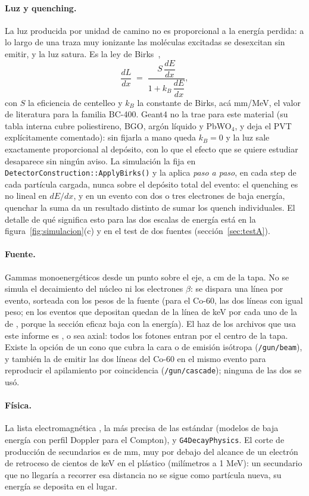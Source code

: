 \documentclass[11pt,a4paper]{article}
\begin{document}
\paragraph{Luz y quenching.} La luz producida por unidad de camino no es
proporcional a la energía perdida: a lo largo de una traza muy ionizante las
moléculas excitadas se desexcitan sin emitir, y la luz satura. Es la ley de
Birks~\cite{birks1951},
\[
   \frac{dL}{dx} \;=\; \frac{S\,\dfrac{dE}{dx}}{1 + k_B\,\dfrac{dE}{dx}},
\]
con $S$ la eficiencia de centelleo y $k_B$ la constante de Birks, acá
\SimBirks{} mm/MeV, el valor de literatura para la familia BC-400. Geant4 no
la trae para este material (su tabla interna cubre poliestireno, BGO, argón
líquido y PbWO$_4$, y deja el PVT explícitamente comentado): sin fijarla a
mano queda $k_B = 0$ y la luz sale exactamente proporcional al depósito, con
lo que el efecto que se quiere estudiar desaparece sin ningún aviso. La
simulación la fija en \texttt{DetectorConstruction::ApplyBirks()} y la
aplica \emph{paso a paso}, en cada step de cada partícula cargada, nunca
sobre el depósito total del evento: el quenching es no lineal en $dE/dx$, y
en un evento con dos o tres electrones de baja energía, quenchar la suma da
un resultado distinto de sumar los quench individuales. El detalle de qué
significa esto para las dos escalas de energía está en la
figura~\ref{fig:simulacion}(c) y en el test de dos fuentes
(sección~\ref{sec:testA}).

\paragraph{Fuente.} Gammas monoenergéticos desde un punto sobre el eje, a
\SimDistancia{} cm de la tapa. No se simula el decaimiento del núcleo ni los
electrones $\beta$: se dispara una línea por evento, sorteada con los pesos de
la fuente (para el Co-60, las dos líneas con igual peso; en los eventos que
depositan quedan \SimRazonLineasCo{} de la línea de \EgammaCoA{} keV por cada
uno de la de \EgammaCoB, porque la sección eficaz baja con la energía). El
haz de los archivos que usa este informe es \SimHaz, o sea axial: todos los
fotones entran por el centro de la tapa. Existe la opción de un cono que
cubra la cara o de emisión isótropa (\texttt{/gun/beam}), y también la de
emitir las dos líneas del Co-60 en el mismo evento para reproducir el
apilamiento por coincidencia (\texttt{/gun/cascade}); ninguna de las dos se
usó.

\paragraph{Física.} La lista electromagnética \SimFisica, la más precisa de
las estándar (modelos de baja energía con perfil Doppler para el Compton), y
\texttt{G4DecayPhysics}. El corte de producción de secundarios es de
\SimCorte{} mm, muy por debajo del alcance de un electrón de retroceso
de cientos de keV en el plástico (milímetros a 1 MeV): un secundario que no
llegaría a recorrer esa distancia no se sigue como partícula nueva, su
energía se deposita en el lugar.
\end{document}
